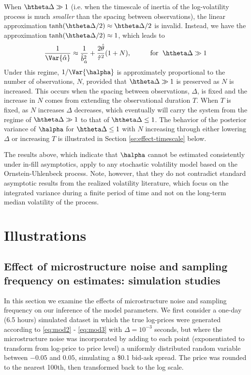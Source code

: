 When $\htheta \Delta \gg 1$ (i.e. when the timescale of inertia of the log-volatility process is much \textit{smaller} than the spacing between
observations), the linear approximation
$\tanh(\htheta \Delta/2) \approx \htheta \Delta/2$ is invalid. Instead, we have
the approximation $\tanh(\htheta \Delta/2) \approx 1 $, which leads to
$$ \frac{1}{\Var{\hat{\alpha}} } \approx \frac{1}{\hat{b}^2_{\hat{\alpha}} }+
\frac{2\hat{\theta} }{\hat{\tau}^2} (1 + N), \hspace*{1cm} \mbox{for }
\; \htheta \Delta \gg 1 $$
Under this regime, $1/\Var{\halpha}$ is approximately proportional to the number of observations, $N$, provided that $\htheta \Delta \gg 1$ is preserved as $N$ is increased.  This occurs when the spacing between observations, $\Delta $, is fixed and the increase in $N$ comes from extending the observational duration $T$.  When $T$ is fixed, as $N$ increases $\Delta $ decreases, which eventually will carry the system from the regime of $\htheta \Delta \gg 1$ to that of $\htheta \Delta \le 1$.  The behavior of the posterior variance of $\halpha$ for $\htheta \Delta \leq 1$ with $N$ increasing through either lowering $\Delta$ or increasing $T$ is illustrated in Section \ref{se:effect-timescale} below.

The results above, which indicate that $\halpha$ cannot be estimated consistently under in-fill asymptotics, apply to any stochastic volatility model based on the Ornstein-Uhlenbeck process.  Note, however, that they do not contradict standard asymptotic results from the realized volatility literature, which focus on the integrated variance during a finite period of time and not on the long-term median volatility of the process.

\section{Illustrations}\label{se:simulation-results}

\subsection{Effect of microstructure noise and sampling frequency on estimates: simulation studies}

In this section we examine the effects of microstructure noise and sampling frequency on our inference of the model parameters. We first consider a one-day (6.5 hours) simulated dataset in which the true log-prices were generated according to \eqref{eq:mod2} - \eqref{eq:mod3} with $\Delta = 10^{-3}$ seconds, but where the microstructure noise was incorporated by adding to each point (exponentiated to transform from log-price to price level) a uniformly distributed random variable between $-0.05$ and $0.05$, simulating a \$0.1 bid-ask spread. The price was rounded to the nearest 100th, then transformed back to the log scale.

